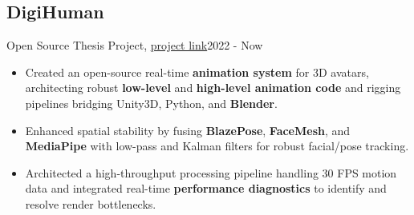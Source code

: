 \subsection{DigiHuman}{Open Source Thesis Project, \href{https://github.com/Danial-Kord/DigiHuman}{project link}}{2022 - Now}
\begin{itemize}
    \item Created an open-source real-time \textbf{animation system} for 3D avatars, architecting robust \textbf{low-level} and \textbf{high-level animation code} and rigging pipelines bridging Unity3D, Python, and \textbf{Blender}.
    \item Enhanced spatial stability by fusing \textbf{BlazePose}, \textbf{FaceMesh}, and \textbf{MediaPipe} with low-pass and Kalman filters for robust facial/pose tracking.
    \item Architected a high-throughput processing pipeline handling 30 FPS motion data and integrated real-time \textbf{performance diagnostics} to identify and resolve render bottlenecks.
\end{itemize}
